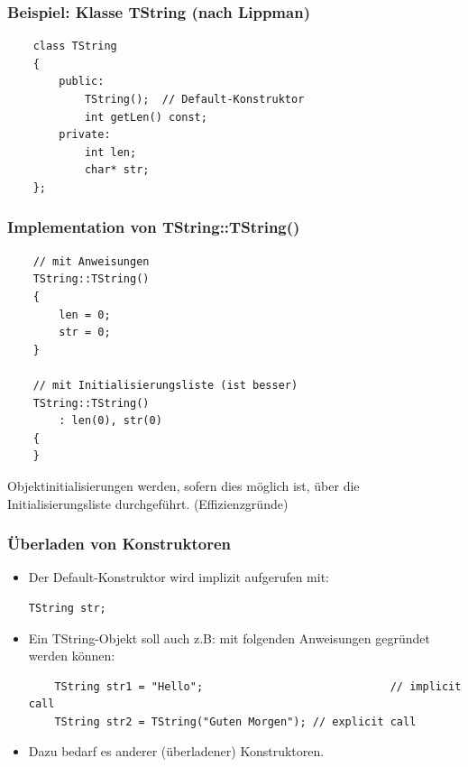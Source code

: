\begin{multicols}{2}
\subsubsection{Beispiel: Klasse TString (nach Lippman)}
\vspace{-\baselineskip}
\begin{minipage}{\linewidth}
	\begin{lstlisting}
	class TString
	{
		public:		
			TString();	// Default-Konstruktor
			int getLen() const;
		private:
			int len;
			char* str;
	};
	\end{lstlisting}	
\end{minipage}
\vfill\null
\columnbreak
\subsubsection{Implementation von TString::TString()}
\vspace{-\baselineskip}
\begin{minipage}{\linewidth}
	\begin{lstlisting}
	// mit Anweisungen
	TString::TString()
	{
		len = 0;
		str = 0;
	}
	
	// mit Initialisierungsliste (ist besser)
	TString::TString()
		: len(0), str(0)
	{
	}
	\end{lstlisting}
\end{minipage}
\begin{hinweis}
	Objektinitialisierungen werden, sofern dies möglich ist, über die Initialisierungsliste durchgeführt. (Effizienzgründe)
\end{hinweis}
\end{multicols}

\subsubsection{Überladen von Konstruktoren}
\begin{itemize}
	\item Der Default-Konstruktor wird implizit aufgerufen mit:\\
	\vspace{-\baselineskip}
	\begin{minipage}{\linewidth}
\begin{lstlisting}
TString str;
\end{lstlisting}
	\end{minipage}
	\item Ein TString-Objekt soll auch z.B: mit folgenden Anweisungen gegründet werden können:\\
	\vspace{-\baselineskip}
	\begin{minipage}{\linewidth}
\begin{lstlisting}
	TString str1 = "Hello";								// implicit call
	TString str2 = TString("Guten Morgen");	// explicit call
\end{lstlisting}
	\end{minipage}
	\item Dazu bedarf es anderer (überladener) Konstruktoren.
\end{itemize}

